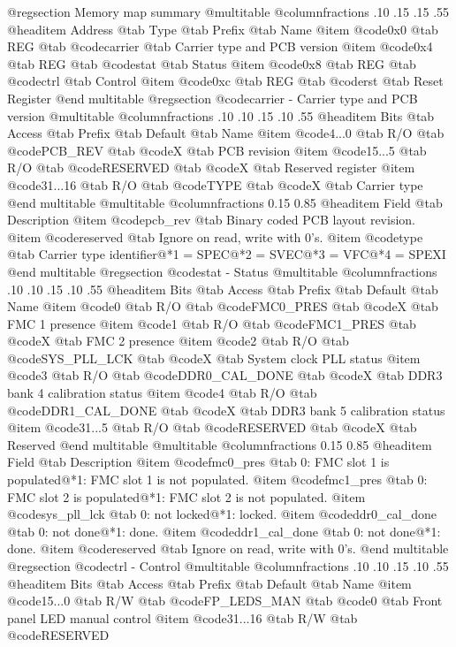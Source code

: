 @regsection Memory map summary
@multitable  @columnfractions .10 .15 .15 .55
@headitem Address @tab Type @tab Prefix @tab Name
@item @code{0x0} @tab
REG @tab
@code{carrier} @tab
Carrier type and PCB version
@item @code{0x4} @tab
REG @tab
@code{stat} @tab
Status
@item @code{0x8} @tab
REG @tab
@code{ctrl} @tab
Control
@item @code{0xc} @tab
REG @tab
@code{rst} @tab
Reset Register
@end multitable 
@regsection @code{carrier} - Carrier type and PCB version
@multitable @columnfractions .10 .10 .15 .10 .55
@headitem Bits @tab Access @tab Prefix @tab Default @tab Name
@item @code{4...0}
@tab R/O @tab
@code{PCB_REV}
@tab @code{X} @tab 
PCB revision
@item @code{15...5}
@tab R/O @tab
@code{RESERVED}
@tab @code{X} @tab 
Reserved register
@item @code{31...16}
@tab R/O @tab
@code{TYPE}
@tab @code{X} @tab 
Carrier type
@end multitable
@multitable @columnfractions 0.15 0.85
@headitem Field @tab Description
@item @code{pcb_rev} @tab Binary coded PCB layout revision.
@item @code{reserved} @tab Ignore on read, write with 0's.
@item @code{type} @tab Carrier type identifier@*1 = SPEC@*2 = SVEC@*3 = VFC@*4 = SPEXI
@end multitable
@regsection @code{stat} - Status
@multitable @columnfractions .10 .10 .15 .10 .55
@headitem Bits @tab Access @tab Prefix @tab Default @tab Name
@item @code{0}
@tab R/O @tab
@code{FMC0_PRES}
@tab @code{X} @tab 
FMC 1 presence
@item @code{1}
@tab R/O @tab
@code{FMC1_PRES}
@tab @code{X} @tab 
FMC 2 presence
@item @code{2}
@tab R/O @tab
@code{SYS_PLL_LCK}
@tab @code{X} @tab 
System clock PLL status
@item @code{3}
@tab R/O @tab
@code{DDR0_CAL_DONE}
@tab @code{X} @tab 
DDR3 bank 4 calibration status
@item @code{4}
@tab R/O @tab
@code{DDR1_CAL_DONE}
@tab @code{X} @tab 
DDR3 bank 5 calibration status
@item @code{31...5}
@tab R/O @tab
@code{RESERVED}
@tab @code{X} @tab 
Reserved
@end multitable
@multitable @columnfractions 0.15 0.85
@headitem Field @tab Description
@item @code{fmc0_pres} @tab 0: FMC slot 1 is populated@*1: FMC slot 1 is not populated.
@item @code{fmc1_pres} @tab 0: FMC slot 2 is populated@*1: FMC slot 2 is not populated.
@item @code{sys_pll_lck} @tab 0: not locked@*1: locked.
@item @code{ddr0_cal_done} @tab 0: not done@*1: done.
@item @code{ddr1_cal_done} @tab 0: not done@*1: done.
@item @code{reserved} @tab Ignore on read, write with 0's.
@end multitable
@regsection @code{ctrl} - Control
@multitable @columnfractions .10 .10 .15 .10 .55
@headitem Bits @tab Access @tab Prefix @tab Default @tab Name
@item @code{15...0}
@tab R/W @tab
@code{FP_LEDS_MAN}
@tab @code{0} @tab 
Front panel LED manual control
@item @code{31...16}
@tab R/W @tab
@code{RESERVED}
